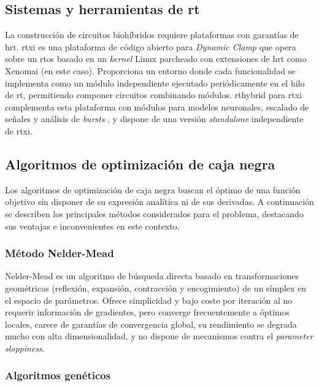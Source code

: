 \subsection{Sistemas y herramientas de \acl{rt}\label{SS:SISTEMAS_RT}}

La construcción de circuitos biohíbridos requiere plataformas con garantías de \ac{hrt}. \ac{rtxi} \cite{RTXI2010} es una plataforma de código abierto para \textit{Dynamic Clamp} que opera sobre un \ac{rtos} basado en un \textit{kernel} Linux parcheado con extensiones de \ac{hrt} como Xenomai \cite{Xenomai2004} (en este caso). Proporciona un entorno donde cada funcionalidad se implementa como un módulo independiente ejecutado periódicamente en el hilo de \ac{rt}, permitiendo componer circuitos combinando módulos. \ac{rthybrid} para \ac{rtxi} \cite{Amaducci2019} complementa esta plataforma con módulos para modelos neuronales, escalado de señales y análisis de \textit{bursts} \cite{Reyes-Sanchez2020}, y dispone de una versión \textit{standalone} independiente de \ac{rtxi}.

\subsection{Algoritmos de optimización de caja negra\label{SS:ALGORITMOS_OPTIMIZACION}}

Los algoritmos de optimización de caja negra buscan el óptimo de una función objetivo sin disponer de su expresión analítica ni de sus derivadas. A continuación se describen los principales métodos considerados para el problema, destacando sus ventajas e inconvenientes en este contexto.

\subsubsection{Método Nelder-Mead}

Nelder-Mead \cite{Nelder1965} es un algoritmo de búsqueda directa basado en transformaciones geométricas (reflexión, expansión, contracción y encogimiento) de un símplex en el espacio de parámetros. Ofrece simplicidad y bajo coste por iteración al no requerir información de gradientes, pero converge frecuentemente a óptimos locales, carece de garantías de convergencia global, su rendimiento se degrada mucho con alta dimensionalidad, y no dispone de mecanismos contra el \textit{parameter sloppiness}.

\subsubsection{Algoritmos genéticos}

